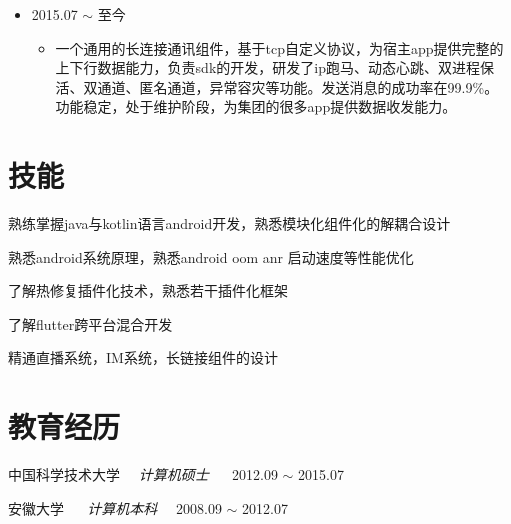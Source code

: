 \documentclass[line,margin,UTF8]{res}
\begin{document}
\begin{resume}
\begin{itemize}
\begin{itemize}

 \end{itemize}
 \end{itemize}
 
\begin{itemize}
\item {} 2015.07 $\sim$ 至今
	\vspace{-3pt}
	\begin{itemize}
		\item 
		一个通用的长连接通讯组件，基于tcp自定义协议，为宿主app提供完整的上下行数据能力，负责sdk的开发，研发了ip跑马、动态心跳、双进程保活、双通道、匿名通道，异常容灾等功能。发送消息的成功率在99.9\%。功能稳定，处于维护阶段，为集团的很多app提供数据收发能力。
\end{itemize}
\end{itemize}

\section{技能}
熟练掌握java与kotlin语言android开发，熟悉模块化组件化的解耦合设计

熟悉android系统原理，熟悉android oom anr 启动速度等性能优化

了解热修复插件化技术，熟悉若干插件化框架

了解flutter跨平台混合开发

精通直播系统，IM系统，长链接组件的设计

\section{教育经历}
中国科学技术大学  ~~{\sl 计算机硕士} ~~ 2012.09 $\sim$ 2015.07

安徽大学 ~~ {\sl 计算机本科} ~~2008.09 $\sim$ 2012.07

 
%


\end{resume}
\end{document}
